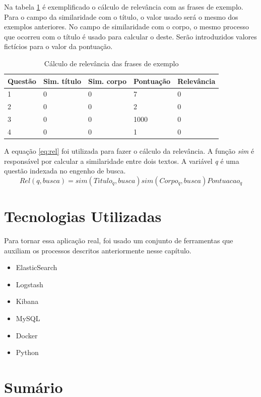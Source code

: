 Na tabela \ref{tab:relevance} é exemplificado o cálculo de relevância com as frases de exemplo. Para o campo da similaridade com o título, o valor usado será o mesmo dos exemplos anteriores. No campo de similaridade com o corpo, o mesmo processo que ocorreu com o título é usado para calcular o deste. Serão introduzidos valores fictícios para o valor da pontuação.

\begin{table}[htb]
	\centering
    \def\arraystretch{1.2} %
    \begin{tabular}{|l|l|l|l|l|}
        \hline
        Questão & Sim. título & Sim. corpo & Pontuação & \textbf{Relevância} \\ \hline
        1 & 0 & 0 & 7 & 0 \\ \hline
        2 & 0 & 0 & 2 & 0 \\ \hline
        3 & 0 & 0 & 1000 & 0 \\ \hline
        4 & 0 & 0 & 1 & 0 \\ \hline
    \end{tabular}
	\caption{Cálculo de relevância das frases de exemplo}
    \label{tab:relevance}
\end{table}

A equação \ref{eq:rel} foi utilizada para fazer o cálculo da relevância. A função \textit{sim} é responsável por calcular a similaridade entre dois textos. A variável \textit{q} é uma questão indexada no engenho de busca.
\begin{equation}
    Rel(q, busca) = sim(Titulo_{q}, busca) sim(Corpo_{q}, busca) Pontuacao_{q} 
    \label{eq:rel}
\end{equation}

\section{Tecnologias Utilizadas}
Para tornar essa aplicação real, foi usado um conjunto de ferramentas que auxiliam os processos descritos anteriormente nesse capítulo.
\begin{itemize}
    \item ElasticSearch
    \item Logstash
    \item Kibana
    \item MySQL
    \item Docker
    \item Python
\end{itemize}
\section{Sumário}
